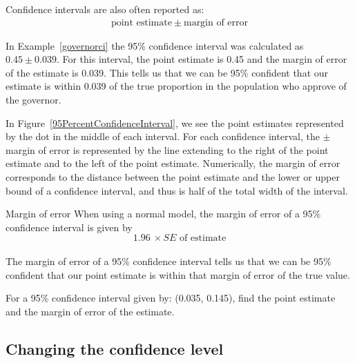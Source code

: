 
\noindent Confidence intervals are also often reported as:
\begin{align*}
\text{point estimate} \ \pm \ \text{margin of error}
\end{align*}

In Example~\ref{governorci} the 95\% confidence interval was calculated as $0.45 \pm 0.039$.  For this interval, the point estimate is 0.45 and the margin of error of the estimate is 0.039.  This tells us that we can be 95\% confident that our estimate is within 0.039 of the true proportion in the population who approve of the governor.  

In Figure~\ref{95PercentConfidenceInterval}, we see the point estimates represented by the dot in the middle of each interval.  For each confidence interval, the $\pm$ margin of error is represented by the line extending to the right of the point estimate and to the left of the point estimate.   Numerically, the margin of error corresponds to the distance between the point estimate and the lower or upper bound of a confidence interval, and thus is half of the total width of the interval.   

\begin{onebox}{Margin of error}\label{marginOfErrorTermBox1}
When using a normal model, the margin of error of a 95\% confidence interval is given by \\
$$1.96 \ \times SE \text{ of estimate}$$\\
The margin of error of a 95\% confidence interval tells us that we can be 95\% confident that our point estimate is within that margin of error of the true value.  
\end{onebox}

\begin{exercisewrap}
\begin{nexercise}For a 95\% confidence interval given by: (0.035, 0.145), find the point estimate and the margin of error of the estimate.\footnotemark
\end{nexercise}
\end{exercisewrap}



\subsection{Changing the confidence level}
\label{changingTheConfidenceLevelSection}

